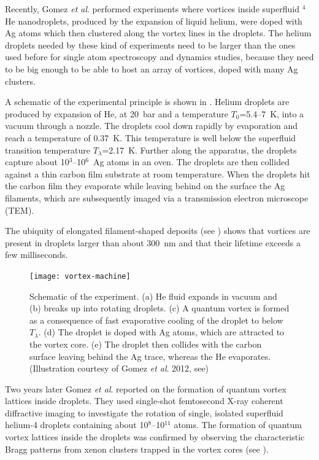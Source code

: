 	Recently, Gomez \emph{et al}. performed experiments\citep{Gomez:2012} where vortices inside superfluid $^4$He nanodroplets, produced by the expansion of liquid helium, were doped with Ag atoms which then clustered along the vortex lines in the droplets. The helium droplets needed by these kind of experiments need to be larger than the ones used before for single atom spectroscopy and dynamics studies, because they need to be big enough to be able to host an array of vortices, doped with many Ag clusters.
	
	A schematic of the experimental principle is shown in . Helium droplets are produced by expansion of He, at 20~bar and a temperature $T_0$=5.4--7~K, into a vacuum through a nozzle. The droplets cool down rapidly by evaporation and reach a temperature of 0.37~K\citep{Hartmann1995}. This temperature is well below the superfluid transition temperature $T_\lambda$=2.17~K\citep{Don91,Pit03}. Further along the apparatus, the droplets capture about 10$^3$–10$^6$~Ag atoms in an oven\citep{Log11d}. The droplets are then collided against a thin carbon film substrate at room temperature\citep{Log11d}. When the droplets hit the carbon film they evaporate while leaving behind on the surface the Ag filaments, which are subsequently imaged via a transmission electron microscope (TEM).
	
	The ubiquity of elongated filament-shaped deposits (see ) shows that vortices are present in droplets larger than about 300~nm and that their lifetime exceeds a few milliseconds.
	
	\begin{figure}[t]
		\begin{center}
			\texttt{[image: vortex-machine]}
			\caption{Schematic of the experiment. (a) He fluid expands in vacuum and (b) breaks up into rotating droplets. (c) A quantum vortex is formed as a consequence of fast evaporative cooling of the droplet to below $T_\lambda$. (d) The droplet is doped with Ag atoms, which are attracted to the vortex core. (e) The droplet then collides with the carbon surface leaving behind the Ag trace, whereas the He evaporates. (Illustration courtesy of Gomez \emph{et al}. 2012, see)}
			\label{fig:vortex-machine}
		\end{center}
	\end{figure}	
	
	Two years later Gomez \emph{et al}. reported\citep{Gom14} on the formation of quantum vortex lattices inside droplets. They used single-shot femtosecond X-ray coherent diffractive imaging to investigate the rotation of single, isolated superfluid helium-4 droplets containing about 10$^8$--10$^{11}$ atoms. The formation of quantum vortex lattices inside the droplets was confirmed by observing the characteristic Bragg patterns from xenon clusters trapped in the vortex cores (see ).

